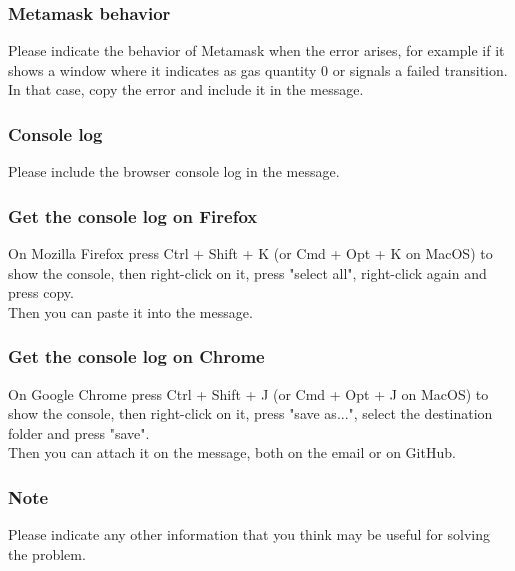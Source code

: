 \documentclass[ManualeUtente]{subfiles}
\begin{document}
\subsubsection{Metamask behavior}
Please indicate the behavior of Metamask when the error arises, for example if it shows a window where it indicates as gas quantity 0 or signals a failed transition. In that case, copy the error and include it in the message.

\subsubsection{Console log}
Please include the browser console log in the message.
\subsubsection{Get the console log on Firefox}
On Mozilla Firefox press Ctrl + Shift + K (or Cmd + Opt + K on MacOS) to show the console, then right-click on it, press "select all", right-click again and press copy. \\
Then you can paste it into the message.
\subsubsection{Get the console log on Chrome}
On Google Chrome press Ctrl + Shift + J (or Cmd + Opt + J on MacOS) to show the console, then right-click on it, press "save as...", select the destination folder and press "save". \\
Then you can attach it on the message, both on the email or on GitHub.

\subsubsection{Note}
Please indicate any other information that you think may be useful for solving the problem.
\end{document}
